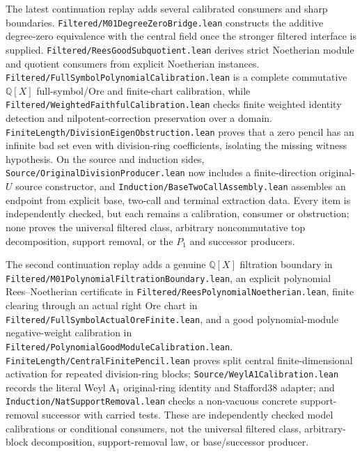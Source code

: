 \documentclass[10pt,a4paper]{article}
\newcommand{\lean}[1]{\nolinkurl{#1}}
\begin{document}
The latest continuation replay adds several calibrated consumers and sharp
boundaries. \lean{Filtered/M01DegreeZeroBridge.lean} constructs the additive
degree-zero equivalence with the central field once the stronger filtered
interface is supplied. \lean{Filtered/ReesGoodSubquotient.lean} derives strict
Noetherian module and quotient consumers from explicit Noetherian instances.
\lean{Filtered/FullSymbolPolynomialCalibration.lean} is a complete
commutative \(\mathbb{Q}[X]\) full-symbol/Ore and finite-chart calibration, while
\lean{Filtered/WeightedFaithfulCalibration.lean} checks finite weighted
identity detection and nilpotent-correction preservation over a domain.
\lean{FiniteLength/DivisionEigenObstruction.lean} proves that a zero pencil has
an infinite bad set even with division-ring coefficients, isolating the
missing witness hypothesis. On the source and induction sides,
\lean{Source/OriginalDivisionProducer.lean} now includes a finite-direction
original-\(U\) source constructor, and
\lean{Induction/BaseTwoCallAssembly.lean} assembles an endpoint from explicit
base, two-call and terminal extraction data. Every item is independently
checked, but each remains a calibration, consumer or obstruction; none proves
the universal filtered class, arbitrary noncommutative top decomposition,
support removal, or the \(P_1\) and successor producers.

The second continuation replay adds a genuine \(\mathbb{Q}[X]\) filtration
boundary in \lean{Filtered/M01PolynomialFiltrationBoundary.lean}, an explicit
polynomial Rees--Noetherian certificate in
\lean{Filtered/ReesPolynomialNoetherian.lean}, finite clearing through an
actual right Ore chart in \lean{Filtered/FullSymbolActualOreFinite.lean}, and
a good polynomial-module negative-weight calibration in
\lean{Filtered/PolynomialGoodModuleCalibration.lean}.
\lean{FiniteLength/CentralFinitePencil.lean} proves split central
finite-dimensional activation for repeated division-ring blocks;
\lean{Source/WeylA1Calibration.lean} records the literal Weyl A\(_1\)
original-ring identity and Stafford38 adapter; and
\lean{Induction/NatSupportRemoval.lean} checks a non-vacuous concrete
support-removal successor with carried tests. These are independently checked
model calibrations or conditional consumers, not the universal filtered
class, arbitrary-block decomposition, support-removal law, or base/successor
producer.
\end{document}
